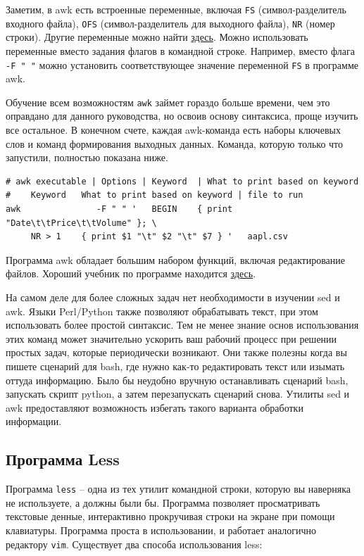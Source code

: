 \documentclass[a4paper,12pt,final,openany]{extbook}
\begin{document}
Заметим, в awk есть встроенные переменные, включая
\texttt{FS} (символ-разделитель входного файла), \texttt{OFS}
(символ-разделитель для выходного файла), \texttt{NR} (номер строки).
Другие переменные можно найти
\href{https://www.tutorialspoint.com/awk/awk_built_in_variables.htm}{здесь}.
Можно использовать переменные вместо задания флагов в командной строке.
Например, вместо флага \texttt{-F " "} можно установить
соответствующее значение переменной \texttt{FS} в программе awk.

Обучение всем возможностям \texttt{awk} займет гораздо больше времени,
чем это оправдано для данного руководства, но освоив основу синтаксиса,
проще изучить все остальное. В конечном счете, каждая awk-команда есть
наборы ключевых слов и команд формирования выходных данных. Команда,
которую только что запустили, полностью показана ниже.

\begin{verbatim}
# awk executable | Options | Keyword  | What to print based on keyword
#    Keyword   What to print based on keyword | file to run
awk               -F " " '   BEGIN    { print "Date\t\tPrice\t\tVolume" }; \
     NR > 1    { print $1 "\t" $2 "\t" $7 } '   aapl.csv
\end{verbatim}

Программа awk обладает большим набором функций, включая редактирование
файлов. Хороший учебник по программе находится
\href{https://likegeeks.com/awk-command/}{здесь}.

На самом деле для более сложных задач нет необходимости в изучении sed
и awk. Языки Perl/Python также позволяют обрабатывать текст, при этом
использовать более простой синтаксис. Тем не менее знание основ
использования этих команд может значительно ускорить ваш рабочий процесс
при решении простых задач, которые периодически возникают. Они также
полезны когда вы пишете сценарий для bash, где нужно как-то
редактировать текст или изымать оттуда информацию. Было бы неудобно
вручную останавливать сценарий bash, запускать скрипт python, а затем
перезапускать сценарий снова. Утилиты sed и awk предоставляют
возможность избегать такого варианта обработки информации.

\hypertarget{Less}{%
\subsection{\texorpdfstring{\protect\hyperlink{Less}{}Программа
Less}{Программа Less}}\label{Less}}

Программа \texttt{less} -- одна из тех утилит командной строки, которую вы
наверняка не используете, а должны были бы. Программа позволяет
просматривать текстовые денные, интерактивно прокручивая строки на экране при помощи клавиатуры. Программа проста в использовании, и
работает аналогично редактору \texttt{vim}. Существует два способа использования
less:
\end{document}
